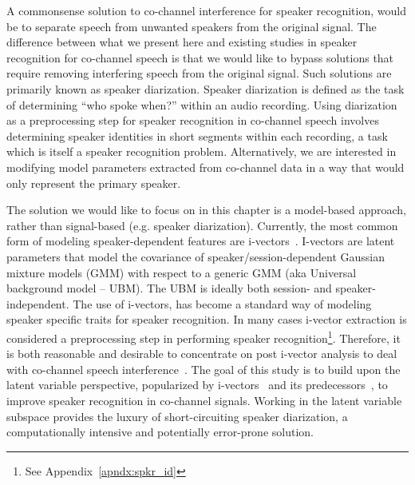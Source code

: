 A commonsense solution to co-channel interference for speaker recognition, would be to separate speech from unwanted speakers from the original signal. 
The difference between what we present here and existing studies in speaker recognition for co-channel speech is that we would like to bypass solutions that require removing interfering speech from the original signal. 
Such solutions are primarily known as speaker diarization. 
Speaker diarization is defined as the task of determining ``who spoke when?'' within an audio recording. 
Using diarization as a preprocessing step for speaker recognition in co-channel speech involves determining speaker identities in short segments within each recording, a task which is itself a speaker recognition problem.  
Alternatively, we are interested in modifying model parameters extracted from co-channel data in a way that would only represent the primary speaker. 

The solution we would like to focus on in this chapter is a model-based approach, rather than signal-based (e.g. speaker diarization). 
Currently, the most common form of modeling speaker-dependent features are i-vectors~\cite{dehak2011front}. 
I-vectors are latent parameters that model the covariance of speaker/session-dependent Gaussian mixture models (GMM) with respect to a generic GMM (aka Universal background model -- UBM).  
The UBM is ideally both session- and speaker-independent.
The use of i-vectors, has become a standard way of modeling speaker specific traits for speaker recognition. 
In many cases i-vector extraction is considered a preprocessing step in performing speaker recognition\footnote{See Appendix~\ref{apndx:spkr_id}}. 
Therefore, it is both reasonable and desirable to concentrate on post i-vector analysis to deal with co-channel speech interference~\cite{ivector_challenge}. 
The goal of this study is to build upon the latent variable perspective, popularized by i-vectors~\cite{dehak2011front} and its predecessors~\cite{kenny2010bayesian}, to improve speaker recognition in co-channel signals. 
Working in the latent variable subspace provides the luxury of short-circuiting speaker diarization, a computationally intensive and potentially error-prone solution. 


